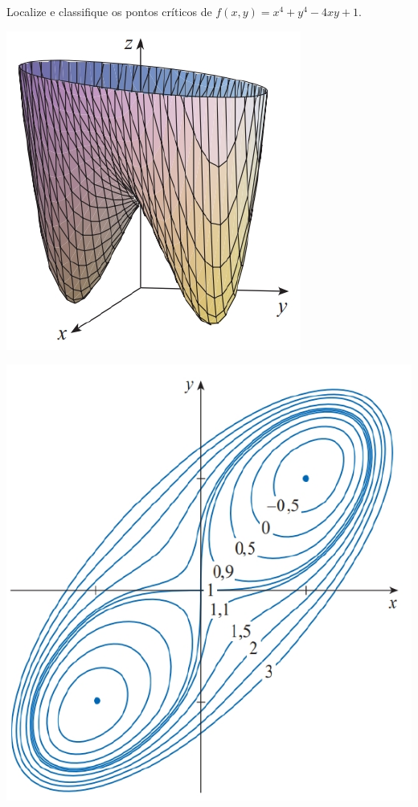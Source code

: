 \begin{frame}[label=otimizacao]
\begin{exe}
Localize e classifique os pontos críticos de $f(x,y)=x^4+y^4-4xy+1$.
\end{exe}
 \begin{minipage}{0.5\textwidth}
 \includegraphics[scale=.5]{figuras/teste-derv2.png}
 \begin{center}
 \end{center}
 \end{minipage}
  \begin{minipage}{0.2\textwidth}
  \includegraphics[scale=.4]{figuras/mapa-cont.png}
  \end{minipage}
\end{frame}

